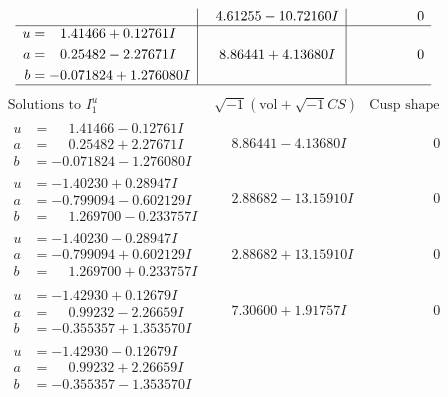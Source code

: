 \documentclass[1p]{elsarticle_modified}
\theoremstyle{definition}
\newcommand{\I}{\sqrt{-1}}
\begin{document}
$$\begin{array}{c|c|c}
 & \phantom{-}4.61255 - 10.72160 I & \phantom{-0.000000 } 0 \\ \hline\begin{aligned}
u &= \phantom{-}1.41466 + 0.12761 I \\
a &= \phantom{-}0.25482 - 2.27671 I \\
b &= -0.071824 + 1.276080 I\end{aligned}
 & \phantom{-}8.86441 + 4.13680 I & \phantom{-0.000000 } 0\\
 \hline 
 \end{array}$$\newpage$$\begin{array}{c|c|c}  
\text{Solutions to }I^u_{1}& \I (\text{vol} + \sqrt{-1}CS) & \text{Cusp shape}\\
 \hline 
\begin{aligned}
u &= \phantom{-}1.41466 - 0.12761 I \\
a &= \phantom{-}0.25482 + 2.27671 I \\
b &= -0.071824 - 1.276080 I\end{aligned}
 & \phantom{-}8.86441 - 4.13680 I & \phantom{-0.000000 } 0 \\ \hline\begin{aligned}
u &= -1.40230 + 0.28947 I \\
a &= -0.799094 - 0.602129 I \\
b &= \phantom{-}1.269700 - 0.233757 I\end{aligned}
 & \phantom{-}2.88682 - 13.15910 I & \phantom{-0.000000 } 0 \\ \hline\begin{aligned}
u &= -1.40230 - 0.28947 I \\
a &= -0.799094 + 0.602129 I \\
b &= \phantom{-}1.269700 + 0.233757 I\end{aligned}
 & \phantom{-}2.88682 + 13.15910 I & \phantom{-0.000000 } 0 \\ \hline\begin{aligned}
u &= -1.42930 + 0.12679 I \\
a &= \phantom{-}0.99232 - 2.26659 I \\
b &= -0.355357 + 1.353570 I\end{aligned}
 & \phantom{-}7.30600 + 1.91757 I & \phantom{-0.000000 } 0 \\ \hline\begin{aligned}
u &= -1.42930 - 0.12679 I \\
a &= \phantom{-}0.99232 + 2.26659 I \\
b &= -0.355357 - 1.353570 I\end{aligned}

\end{array}$$
\end{document}
